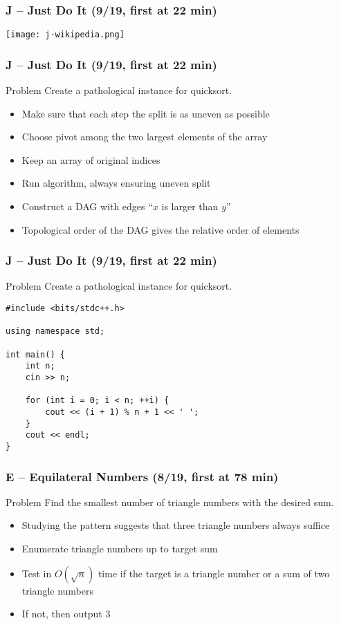 \documentclass{beamer}
\begin{document}
\begin{frame}
\frametitle{J -- Just Do It (9/19, first at 22 min)}
    \texttt{[image: j-wikipedia.png]}
\end{frame}

\begin{frame}
\frametitle{J -- Just Do It (9/19, first at 22 min)}
    \begin{block}{Problem}
        Create a pathological instance for quicksort.
    \end{block}
    \begin{itemize}
        \item Make sure that each step the split is as uneven as possible
        \item Choose pivot among the two largest elements of the array
        \pause
        \item Keep an array of original indices
        \item Run algorithm, always ensuring uneven split
        \item Construct a DAG with edges ``$x$ is larger than $y$''
        \item Topological order of the DAG gives the relative order of elements
    \end{itemize}
\end{frame}

\begin{frame}[containsverbatim]
\frametitle{J -- Just Do It (9/19, first at 22 min)}
    \begin{block}{Problem}
        Create a pathological instance for quicksort.
    \end{block}
\begin{verbatim}
#include <bits/stdc++.h>
 
using namespace std;
 
int main() {
	int n;
	cin >> n;
 
	for (int i = 0; i < n; ++i) {
		cout << (i + 1) % n + 1 << ' ';
	}
	cout << endl;
}
\end{verbatim}
\end{frame}


\begin{frame}
\frametitle{E -- Equilateral Numbers (8/19, first at 78 min)}
    \begin{block}{Problem}
        Find the smallest number of triangle numbers with the desired sum.
    \end{block}
\begin{itemize}
    \item Studying the pattern suggests that three triangle numbers always suffice
    \item Enumerate triangle numbers up to target sum
    \item Test in $O(\sqrt{n})$ time if the target is a triangle number or a sum of two triangle numbers
    \item If not, then output $3$
\end{itemize}
\end{frame}
\end{document}
